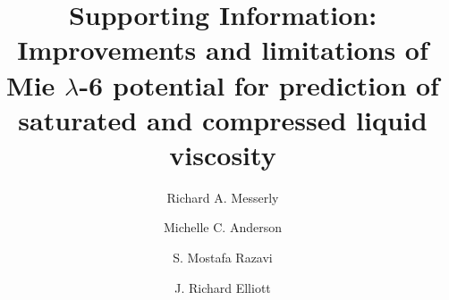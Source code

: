 \documentclass[preprint,review,11pt]{elsarticle}
\begin{document}
	
	\begin{frontmatter}
		
		
		
		\title{Supporting Information: Improvements and limitations of Mie $\lambda$-6 potential for prediction of saturated and compressed liquid viscosity}
		
		
		\author{Richard A. Messerly}
		\address{Thermodynamics Research Center, National Institute of Standards and Technology, Boulder, Colorado, 80305}
		
		\author{Michelle C. Anderson}
		\address{Thermodynamics Research Center, National Institute of Standards and Technology, Boulder, Colorado, 80305}
		
		\author{S. Mostafa Razavi}
		\address{Department of Chemical and Biomolecular Engineering, The University of Akron, Akron, Ohio, 44325-3906}
		
		\author{J. Richard Elliott}
		\address{Department of Chemical and Biomolecular Engineering, The University of Akron, Akron, Ohio, 44325-3906}
		

\end{frontmatter}
\end{document}

